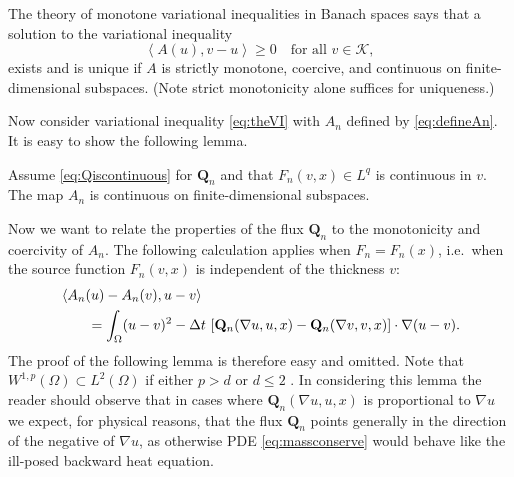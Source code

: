 \documentclass[final,onefignum]{siamart190516}
\newcommand\bQ{\mathbf{Q}}
\newcommand{\grad}{\nabla}
\newcommand{\ip}[2]{\ensuremath{\left<#1,#2\right>}}
\newcommand\RR{\mathbb{R}}
\begin{document}
The theory of monotone variational inequalities in Banach spaces \cite[chapter III]{KinderlehrerStampacchia1980} says that a solution to the variational inequality
\begin{equation}
    \ip{A(u)}{v-u} \ge 0 \quad \text{for all $v\in\mathcal{K}$}, \label{eq:VIabstract}
\end{equation}
exists and is unique if $A$ is strictly monotone, coercive, and continuous on finite-dimensional subspaces.  (Note strict monotonicity alone suffices for uniqueness.)

Now consider variational inequality \eqref{eq:theVI} with $A_n$ defined by \eqref{eq:defineAn}.  It is easy to show the following lemma.

\begin{lemma}  \label{lem:continuous}  Assume \eqref{eq:Qiscontinuous} for $\bQ_n$ and that $F_n(v,x)\in L^q$ is continuous in $v$.  The map $A_n$ is continuous on finite-dimensional subspaces.
\end{lemma}


Now we want to relate the properties of the flux $\bQ_n$ to the monotonicity and coercivity of $A_n$.  The following calculation applies when $F_n=F_n(x)$, i.e.~when the source function $F_n(v,x)$ is independent of the thickness $v$:
\begin{align}
   &\ip{A_n(u) - A_n(v)}{u-v}  \label{eq:AtoQcalculation} \\
   &\qquad = \int_\Omega (u-v)^2 - \Delta t\, \left[\bQ_n(\grad u,u,x) - \bQ_n(\grad v,v,x)\right] \cdot \grad(u-v).  \notag
\end{align}
The proof of the following lemma is therefore easy and omitted.  Note that $W^{1,p}(\Omega) \subset L^2(\Omega)$ if either $p>d$ or $d\le 2$ \cite[theorems 5.6.2 and 5.6.5]{Evans2010}.  %
In considering this lemma the reader should observe that in cases where $\bQ_n(\grad u,u,x)$ is proportional to $\grad u$ we expect, for physical reasons, that the flux $\bQ_n$ points generally in the direction of the negative of $\grad u$, as otherwise PDE \eqref{eq:massconserve} would behave like the ill-posed backward heat equation.
\end{document}
